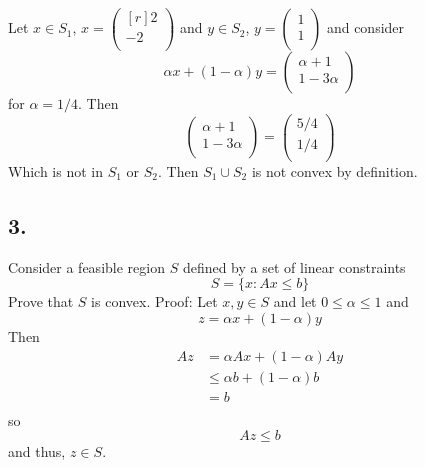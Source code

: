 \documentclass{article}
\begin{document}
\newline
Let $x \in S_1$, $x = \begin{pmatrix*}[r]  2\\-2\\ \end{pmatrix*}$ and $y \in S_2$, $y = \begin{pmatrix} 1\\1\\ \end{pmatrix}$ and consider
\[\alpha x + (1 - \alpha)y = \begin{pmatrix}
    \alpha + 1\\
    1 - 3\alpha\\
\end{pmatrix}\]
for $\alpha = 1/4$. Then
\[\begin{pmatrix}
    \alpha + 1\\
    1 - 3\alpha \\
\end{pmatrix}
=
\begin{pmatrix}
    5/4\\
    1/4\\
\end{pmatrix}\]
Which is not in $S_1$ or $S_2$. Then $S_1 \cup S_2$ is not convex by definition.

\subsection*{3.} Consider a feasible region $S$ defined by a set of linear constraints
\[S = \{x : Ax \leq b\}\]
Prove that $S$ is convex.
\newline\newline
Proof: Let $x, y \in S$ and let $0 \leq \alpha \leq 1$ and
\[z = \alpha x + (1- \alpha)y\]
Then
\begin{align*}
    Az &= \alpha Ax + (1 - \alpha)Ay \\
    &\leq \alpha b + (1- \alpha)b \\
    &= b\\
\end{align*}
so
\[Az \leq b\]
and thus, $z \in S$. 
\end{document}
